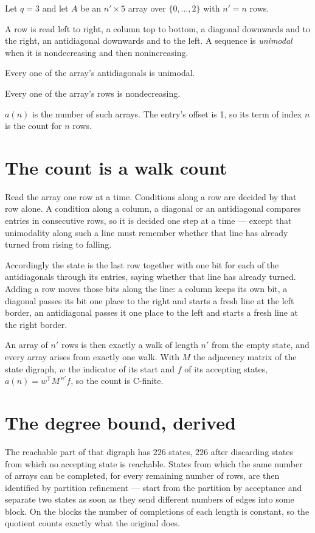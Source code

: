 \documentclass[11pt]{article}
\theoremstyle{definition}
\begin{document}
Let $q = 3$ and let $A$ be an $n' \times 5$ array over $\{0,\dots,2\}$ with $n' = n$ rows.

A row is read left to right, a column top to bottom, a diagonal downwards and to the right, an antidiagonal downwards and to the left. A sequence is {\itshape unimodal} when it is nondecreasing and then nonincreasing.

Every one of the array's antidiagonals is unimodal.

Every one of the array's rows is nondecreasing.

$a(n)$ is the number of such arrays. The entry's offset is 1, so its term of index $n$ is the count for $n$ rows.

\section{The count is a walk count}

Read the array one row at a time. Conditions along a row are decided by that row alone. A condition along a column, a diagonal or an antidiagonal compares entries in consecutive rows, so it is decided one step at a time --- except that unimodality along such a line must remember whether that line has already turned from rising to falling.

Accordingly the state is the last row together with one bit for each of the antidiagonals through its entries, saying whether that line has already turned. Adding a row moves those bits along the line: a column keeps its own bit, a diagonal passes its bit one place to the right and starts a fresh line at the left border, an antidiagonal passes it one place to the left and starts a fresh line at the right border.

An array of $n'$ rows is then exactly a walk of length $n'$ from the empty state, and every array arises from exactly one walk. With $M$ the adjacency matrix of the state digraph, $w$ the indicator of its start and $f$ of its accepting states, $a(n) = w^{\mathsf T}M^{\,n'}f$, so the count is C-finite.

\section{The degree bound, derived}

The reachable part of that digraph has $226$ states, $226$ after discarding states from which no accepting state is reachable. States from which the same number of arrays can be completed, for every remaining number of rows, are then identified by partition refinement --- start from the partition by acceptance and separate two states as soon as they send different numbers of edges into some block. On the blocks the number of completions of each length is constant, so the quotient counts exactly what the original does.
\end{document}

